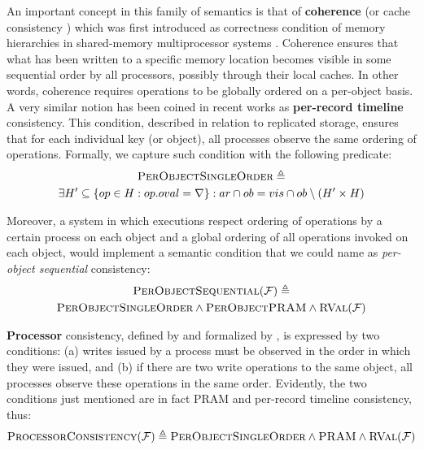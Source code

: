\documentclass[letter, 11pt]{article}
\newcommand{\RVAL}{\textsc{RVal}(\mathcal{F})}
\newcommand{\citeN}{\citet}
\renewcommand{\cite}{\citep}
\begin{document}
An important concept in this family of semantics is that of \textbf{coherence} 
\cite{Gharachorloo.Lenoski.ea:90} (or cache consistency \cite{Goodman:89})
which was first introduced as correctness condition of memory hierarchies in 
shared-memory multiprocessor systems \cite{Dubois.Scheurich.ea:86}.
Coherence ensures that what has been written to a specific memory location becomes visible in some sequential order by all processors, 
possibly through their local caches.
In other words, coherence requires operations to be globally ordered on a per-object basis.
A very similar notion has been coined in recent works \cite{Cooper.Ramakrishnan.ea:08,Lloyd.Freedman.ea:11} 
as \textbf{per-record timeline} consistency.
This condition, described in relation to replicated storage,
ensures that for each individual key (or object), all processes observe the same ordering of operations.
Formally, we capture such condition with the following predicate:
\begin{multline}
\textsc{PerObjectSingleOrder} \triangleq \\ \exists H' \subseteq \{op \in H : op.oval = \nabla\}: 
ar \cap ob = vis \cap ob \setminus(H' \times H) 
\end{multline}

Moreover, a system in which executions respect 
ordering of operations by a certain process on each object and 
a global ordering of all operations invoked on each object,
would implement a semantic condition that we could name as \emph{per-object sequential} consistency:
\begin{multline}
\textsc{PerObjectSequential}(\mathcal{F}) \triangleq \\
\textsc{PerObjectSingleOrder} \wedge \textsc{PerObjectPRAM} \wedge \RVAL
\end{multline}

\textbf{Processor} consistency, defined by \citeN{Goodman:89}
and formalized by \citeN{Ahamad.Bazzi.ea:93}, is expressed by two conditions:
(a) writes issued by a process must be observed in the order in which they were issued, and
(b) if there are two write operations to the same object, 
all processes observe these operations in the same order.
Evidently, the two conditions just mentioned are in fact PRAM and per-record timeline consistency, thus:
\begin{align}
\textsc{ProcessorConsistency}(\mathcal{F}) \triangleq \textsc{PerObjectSingleOrder} \wedge \textsc{PRAM} \wedge \RVAL
\end{align}
\end{document}
